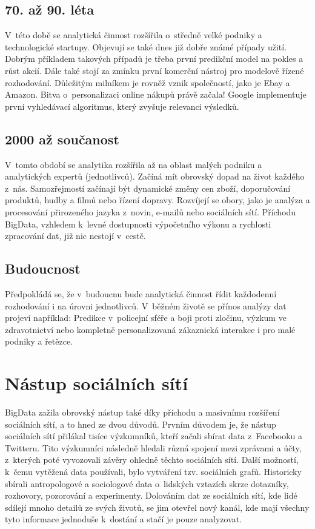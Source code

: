 \subsection{70. až 90. léta}
V~této době se analytická činnost rozšířila o~středně velké podniky a technologické startupy. Objevují se také dnes již dobře známé případy užití. Dobrým příkladem takových případů je třeba první predikční model na pokles a růst akcií. Dále také stojí za zmínku první komerční nástroj pro modelově řízené rozhodování. Důležitým milníkem je rovněž vznik společností, jako je Ebay a Amazon. Bitva o~personalizaci online nákupů právě začala! Google implementuje první vyhledávací algoritmus, který zvyšuje relevanci výsledků.

\subsection{2000 až součanost}
V~tomto období se analytika rozšířila až na oblast malých podniku a analytických expertů (jednotlivců). Začíná mít obrovský dopad na život každého z~nás. Samozřejmostí začínají být dynamické změny cen zboží, doporučování produktů, hudby a filmů nebo řízení dopravy. Rozvíjejí se obory, jako je analýza a procesování přirozeného jazyka z~novin, e-mailů nebo sociálních sítí. Příchodu BigData, vzhledem k~levné dostupnosti výpočetního výkonu a rychlosti zpracování dat, již nic nestojí v~cestě.

\subsection{Budoucnost}
Předpokládá se, že v~budoucnu bude analytická činnost řídit každodenní rozhodování i na úrovni jednotlivců. V~běžném životě se přínos analýzy dat projeví například: Predikce v~policejní sféře a boji proti zločinu, výzkum ve zdravotnictví nebo kompletně personalizovaná zákaznická interakce i pro malé podniky a řetězce.

\section{Nástup sociálních sítí}
BigData zažila obrovský nástup také díky příchodu a masivnímu rozšíření sociálních sítí, a to hned ze dvou důvodů. Prvním důvodem je, že nástup sociálních sítí přilákal tisíce výzkumníků, kteří začali sbírat data z~Facebooku a Twitteru. Tito výzkumníci následně hledali různá spojení mezi zprávami a účty, z~kterých poté vyvozovali závěry ohledně těchto sociálních sítí. Další možností, k~čemu vytěžená data používali, bylo vytváření tzv. sociálních grafů. Historicky sbírali antropologové a sociologové data o~lidských vztazích skrze dotazníky, rozhovory, pozorování a experimenty. Dolováním dat ze sociálních sítí, kde lidé sdílejí mnoho detailů ze svých životů, se jim otevřel nový kanál, kde mají všechny tyto informace jednoduše k~dostání a stačí je pouze analyzovat.


